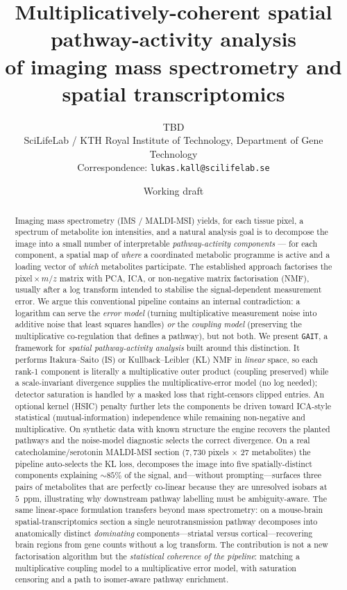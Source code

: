 \documentclass[11pt]{article}
\title{Multiplicatively-coherent spatial pathway-activity analysis\\
of imaging mass spectrometry and spatial transcriptomics}
\author{%
  TBD\\
  \small SciLifeLab / KTH Royal Institute of Technology, Department of Gene Technology\\
  \small Correspondence: \texttt{lukas.kall@scilifelab.se}
}
\date{Working draft}
\newcommand{\code}[1]{\texttt{#1}}
\begin{document}
\maketitle

\begin{abstract}
Imaging mass spectrometry (IMS / MALDI-MSI) yields, for each tissue pixel, a spectrum of
metabolite ion intensities, and a natural analysis goal is to decompose the image into a
small number of interpretable \emph{pathway-activity components} --- for each component, a
spatial map of \emph{where} a coordinated metabolic programme is active and a loading
vector of \emph{which} metabolites participate. The established approach factorises the
pixel\,$\times$\,$m/z$ matrix with PCA, ICA, or non-negative matrix factorisation (NMF),
usually after a log transform intended to stabilise the signal-dependent measurement
error. We argue this conventional pipeline contains an internal contradiction: a logarithm
can serve the \emph{error model} (turning multiplicative measurement noise into additive
noise that least squares handles) \emph{or} the \emph{coupling model} (preserving the
multiplicative co-regulation that defines a pathway), but not both. We present
\code{GAIT}, a framework for \emph{spatial pathway-activity analysis} built around
this distinction. It performs
Itakura--Saito (IS) or Kullback--Leibler (KL) NMF in \emph{linear} space, so each rank-1
component is literally a multiplicative outer product (coupling preserved) while a
scale-invariant divergence supplies the multiplicative-error model (no log needed);
detector saturation is handled by a masked loss that right-censors clipped entries. An
optional kernel (HSIC) penalty further lets the components be driven toward ICA-style
statistical (mutual-information) independence while remaining non-negative and
multiplicative. On synthetic data with known structure the engine recovers the planted
pathways and the noise-model diagnostic selects the correct divergence. On a real
catecholamine/serotonin MALDI-MSI section ($7{,}730$ pixels $\times$ $27$ metabolites) the
pipeline auto-selects the KL loss, decomposes the image into five spatially-distinct
components explaining ${\sim}85\%$ of the signal, and---without prompting---surfaces three
pairs of metabolites that are perfectly co-linear because they are unresolved isobars at
$5$~ppm, illustrating why downstream pathway labelling must be ambiguity-aware. The same
linear-space formulation transfers beyond mass spectrometry: on a mouse-brain
spatial-transcriptomics section a single neurotransmission pathway decomposes into
anatomically distinct \emph{dominating} components---striatal versus cortical---recovering
brain regions from gene counts without a log transform. The
contribution is not a new factorisation algorithm but the \emph{statistical coherence of
the pipeline}: matching a multiplicative coupling model to a multiplicative error model,
with saturation censoring and a path to isomer-aware pathway enrichment.
\end{abstract}
\end{document}
